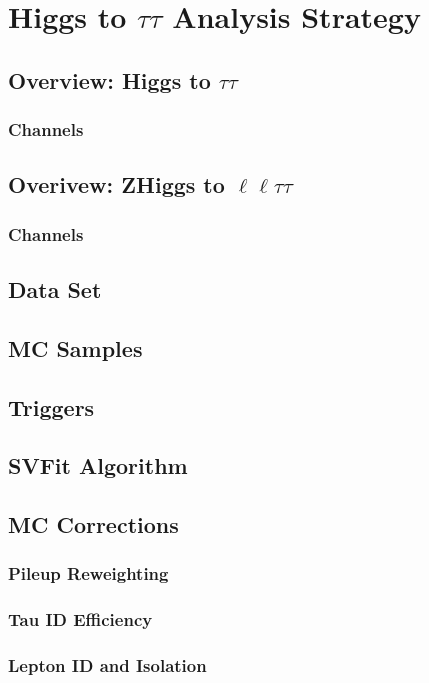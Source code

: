 \chapter{Higgs to $\tau\tau$ Analysis Strategy}

\section{Overview: Higgs to $\tau\tau$}
\subsection{Channels}
\section{Overivew: ZHiggs to $\ell\ell\tau\tau$}
\subsection{Channels}
\section{Data Set}
\section{MC Samples}
\section{Triggers}
\section{SVFit Algorithm}

\pagebreak

\section{MC Corrections}
\subsection{Pileup Reweighting}
\subsection{Tau ID Efficiency}
\subsection{Lepton ID and Isolation}
